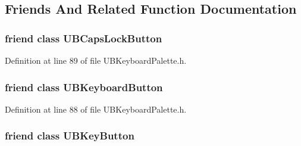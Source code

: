 \subsection{Friends And Related Function Documentation}
\hypertarget{class_u_b_keyboard_palette_a581dfcd5d1c8859bf8b05143bcc82245}{
\subsubsection[{U\-B\-Caps\-Lock\-Button}]{\setlength{\rightskip}{0pt plus 5cm}friend class {\bf U\-B\-Caps\-Lock\-Button}\hspace{0.3cm}{\ttfamily [friend]}}}\label{d6/d6e/class_u_b_keyboard_palette_a581dfcd5d1c8859bf8b05143bcc82245}


Definition at line 89 of file U\-B\-Keyboard\-Palette.\-h.

\hypertarget{class_u_b_keyboard_palette_a2fee37f0ee7ccf18ed88d1b5b948df46}{
\subsubsection[{U\-B\-Keyboard\-Button}]{\setlength{\rightskip}{0pt plus 5cm}friend class {\bf U\-B\-Keyboard\-Button}\hspace{0.3cm}{\ttfamily [friend]}}}\label{d6/d6e/class_u_b_keyboard_palette_a2fee37f0ee7ccf18ed88d1b5b948df46}


Definition at line 88 of file U\-B\-Keyboard\-Palette.\-h.

\hypertarget{class_u_b_keyboard_palette_af8def2211b5ddbef04883b9e2b3f00d1}{
\subsubsection[{U\-B\-Key\-Button}]{\setlength{\rightskip}{0pt plus 5cm}friend class {\bf U\-B\-Key\-Button}\hspace{0.3cm}{\ttfamily [friend]}}}\label{d6/d6e/class_u_b_keyboard_palette_af8def2211b5ddbef04883b9e2b3f00d1}


